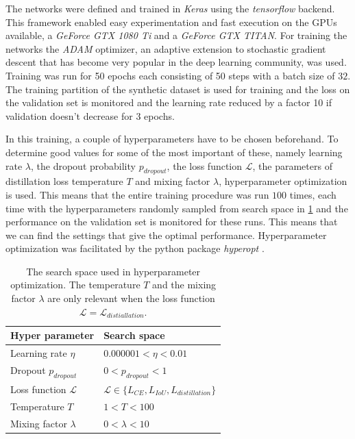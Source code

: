 \documentclass{kththesis}
\begin{document}
The networks were defined and trained in \textit{Keras} \parencite{keras} using the
\textit{tensorflow} \parencite{tensorflow} backend. This framework enabled easy
experimentation and fast execution on the GPUs available, a \textit{GeForce GTX
  1080 Ti} and a \textit{GeForce GTX TITAN}. For training the networks the
\textit{ADAM} optimizer\parencite{ADAM}, an adaptive extension to stochastic
gradient descent that has become very popular in the deep learning community, was
used. Training was run for 50 epochs each consisting of 50 steps with a batch
size of \(32\). The training partition of the synthetic dataset is used for
training and the loss on the validation set is monitored and the learning rate
reduced by a factor 10 if validation doesn't decrease for \(3\) epochs.

In this training, a couple of hyperparameters have to be chosen beforehand. To
determine good values for some of the most important of these, namely
learning rate \(\lambda\), the dropout probability \(p_{dropout}\), the
loss function \(\mathcal{L}\), the parameters of distillation loss
temperature \(T\) and mixing factor \(\lambda\), hyperparameter optimization is
used. This means that the entire training procedure was run \(100\) times, each
time with the hyperparameters randomly sampled from search space in
\cref{tab:search_space} and the performance on the validation set is monitored
for these runs. This means that we can find the settings that give the optimal
performance. Hyperparameter optimization was facilitated by the python package
\textit{hyperopt} \parencite{hyperopt}.

\begin{table}[]
\centering
\caption{The search space used in hyperparameter optimization. The temperature
  \(T\) and the mixing factor \(\lambda\) are only relevant when the loss
  function \(\mathcal{L} = \mathcal{L}_{distiallation}\).}
\label{tab:search_space}
\begin{tabular}{@{}ll@{}}
\toprule
Hyper parameter     & Search space \\ \midrule
Learning rate \(\eta\)      &      \(0.000001 < \eta < 0.01\)        \\
Dropout \(p_{dropout}\)&  \( 0 < p_{dropout} < 1\)            \\
Loss function \(\mathcal{L}\)    &    \(\mathcal{L} \in \{L_{CE},L_{IoU}, L_{distillation}\}\)          \\
Temperature \(T\)        &      \( 1 < T < 100\)        \\
Mixing factor \(\lambda\)      &     \(0< \lambda <10\)         \\ \bottomrule
\end{tabular}
\end{table}
\end{document}
